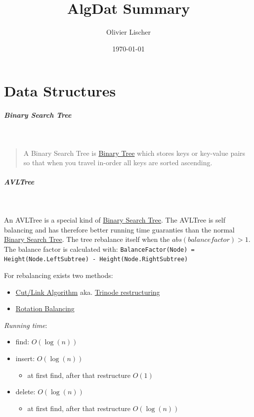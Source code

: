 \documentclass[11pt,twoside,twocolumn,landscape]{article}
\author{Olivier Lischer}
\date{\today}
\title{AlgDat Summary}
\begin{document}
\pagestyle{fancy}
\fancyhf{}
\fancyfoot[CE,CO]{\leftmark}
\fancyfoot[R]{\thepage}

\tableofcontents
\newpage


\section{Data Structures}
\label{sec:orgb3b98bf}
\subparagraph{Binary Search Tree} \
\label{sec:org94e1f97}
\begin{quote}
A Binary Search Tree is \href{../../../roam/20210806225200-binary_tree.org}{Binary Tree} which stores keys or key-value pairs so
that when you travel in-order all keys are sorted ascending.
\end{quote}

\subparagraph{AVLTree} \
\label{sec:org9056e00}

An AVLTree is a special kind of \href{../../../roam/20211008140953-binary_search_tree.org}{Binary Search Tree}.
The AVLTree is self balancing and has therefore better running time guaranties than the normal \href{../../../roam/20211008140953-binary_search_tree.org}{Binary Search Tree}.
The tree rebalance itself when the \(abs(balance factor) > 1\).
The balance factor is calculated with: \texttt{BalanceFactor(Node) = Height(Node.LeftSubtree) - Height(Node.RightSubtree)}


For rebalancing exists two methods:
\begin{itemize}
\item \href{../../../roam/20211008144714-cut_link_algorithm.org}{Cut/Link Algorithm} aka. \href{../../../roam/20211008144714-cut_link_algorithm.org}{Trinode restructuring}
\item \href{../../../roam/20211008145521-rotation_balancing.org}{Rotation Balancing}
\end{itemize}

\emph{Running time}:
\begin{itemize}
\item find: \(O(\log (n))\)
\item insert: \(O(\log (n))\)
\begin{itemize}
\item at first find, after that restructure \(O(1)\)
\end{itemize}
\item delete: \(O(\log (n))\)
\begin{itemize}
\item at first find, after that restructure \(O(\log (n))\)
\end{itemize}
\end{itemize}
\end{document}
